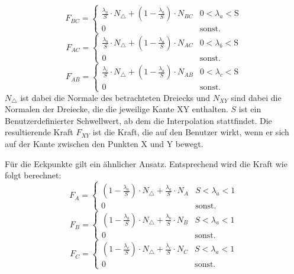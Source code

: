 \documentclass[conference]{IEEEtran}
\begin{document}
\begin{equation*}
    F_{BC} = 
    \begin{cases} 
        \frac{\lambda_a}{S}\cdot N_{\triangle} + (1-\frac{\lambda_a}{S})\cdot N_{BC} &  0 < \lambda_a < \text{S} \\
        0 & \text{sonst.}
    \end{cases}
\end{equation*}
\begin{equation*}
    F_{AC} = 
    \begin{cases} 
        \frac{\lambda_b}{S}\cdot N_{\triangle} + (1-\frac{\lambda_a}{S})\cdot N_{AC} &  0 < \lambda_b < \text{S} \\
        0 & \text{sonst.}
    \end{cases}
\end{equation*}
\begin{equation*}
    F_{AB} = 
    \begin{cases} 
        \frac{\lambda_c}{S}\cdot N_{\triangle} + (1-\frac{\lambda_a}{S})\cdot N_{AB} &  0 < \lambda_c < \text{S} \\
        0 & \text{sonst.}
    \end{cases}
\end{equation*}
$N_{\triangle}$ ist dabei die Normale des betrachteten Dreiecks und $N_{XY}$ sind dabei die Normalen der 
Dreiecke, die die jeweilige Kante XY enthalten. $S$ ist ein Benutzerdefinierter Schwellwert, ab dem die 
Interpolation stattfindet.
Die resultierende Kraft $F_{XY}$ ist die Kraft, die auf den Benutzer wirkt, wenn er sich auf der Kante 
zwischen den Punkten X und Y bewegt.

Für die Eckpunkte gilt ein ähnlicher Ansatz. Entsprechend wird die Kraft wie folgt berechnet:
\begin{equation*}
    F_{A} = 
    \begin{cases} 
        (1-\frac{\lambda_a}{S})\cdot N_{\triangle} + \frac{\lambda_a}{S}\cdot N_{A} &  S < \lambda_a < 1 \\
        0 & \text{sonst.}
    \end{cases}
\end{equation*} 
\begin{equation*}
    F_{B} = 
    \begin{cases} 
        (1-\frac{\lambda_b}{S})\cdot N_{\triangle} + \frac{\lambda_b}{S}\cdot N_{B} &  S < \lambda_a < 1 \\
        0 & \text{sonst.}
    \end{cases}
\end{equation*} 
\begin{equation*}
    F_{C} = 
    \begin{cases} 
        (1-\frac{\lambda_c}{S})\cdot N_{\triangle} + \frac{\lambda_c}{S}\cdot N_{C} &  S < \lambda_a < 1 \\
        0 & \text{sonst.}
    \end{cases}
\end{equation*} 
\end{document}
